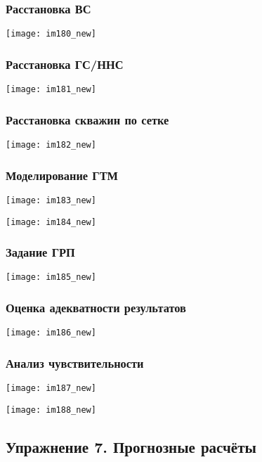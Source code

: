 \documentclass[main.tex]{subfiles}
\begin{document}
\subsubsection{Расстановка ВС}

\texttt{[image: im180\_new]}

\subsubsection{Расстановка ГС/ННС}

\texttt{[image: im181\_new]}

\subsubsection{Расстановка скважин по сетке}

\texttt{[image: im182\_new]}

\subsubsection{Моделирование ГТМ}

\texttt{[image: im183\_new]}

\texttt{[image: im184\_new]}

\subsubsection{Задание ГРП}

\texttt{[image: im185\_new]}

\subsubsection{Оценка адекватности результатов}

\texttt{[image: im186\_new]}

\subsubsection{Анализ чувствительности}

\texttt{[image: im187\_new]}

\texttt{[image: im188\_new]}

\subsection{Упражнение 7. Прогнозные расчёты}
\end{document}

